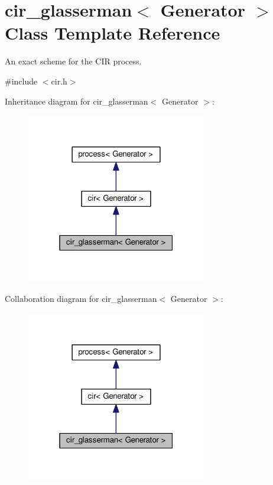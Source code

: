 \hypertarget{classcir__glasserman}{}\section{cir\+\_\+glasserman$<$ Generator $>$ Class Template Reference}
\label{classcir__glasserman}


An exact scheme for the C\+IR process.  




{\ttfamily \#include $<$cir.\+h$>$}



Inheritance diagram for cir\+\_\+glasserman$<$ Generator $>$\+:\nopagebreak
\begin{figure}[H]
\begin{center}
\leavevmode
\includegraphics[width=223pt]{classcir__glasserman__inherit__graph}
\end{center}
\end{figure}


Collaboration diagram for cir\+\_\+glasserman$<$ Generator $>$\+:\nopagebreak
\begin{figure}[H]
\begin{center}
\leavevmode
\includegraphics[width=223pt]{classcir__glasserman__coll__graph}
\end{center}
\end{figure}
